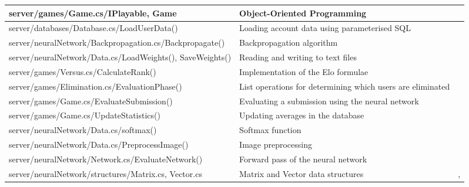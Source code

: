\documentclass{article}
\begin{document}
\begin{table}[H]
\begin{tabularx}{\textwidth}{|L|L|p{1cm}|}
        server/games/\newline Game.cs/IPlayable, Game & Object-Oriented Programming &\pageref{server/games/game.cs} \\\hline
        server/databases/\newline Database.cs/LoadUserData() & Loading account data using parameterised SQL &\pageref{server/databases/database.cs} \\\hline
        server/neuralNetwork/\newline Backpropagation.cs/Backpropagate() & Backpropagation algorithm &\pageref{server/neuralnetwork/backpropagation.cs} \\\hline
        server/neuralNetwork/\newline Data.cs/LoadWeights(), SaveWeights() & Reading and writing to text files &\pageref{server/neuralnetwork/data.cs} \\\hline
        server/games/\newline Versus.cs/CalculateRank() & Implementation of the Elo formulae &\pageref{server/games/versus.cs} \\\hline
        server/games/\newline Elimination.cs/EvaluationPhase() & List operations for determining which users are eliminated &\pageref{server/games/elimination.cs} \\\hline
        server/games/\newline Game.cs/EvaluateSubmission() & Evaluating a submission using the neural network &\pageref{server/games/game.cs} \\\hline
        server/games/\newline Game.cs/UpdateStatistics() & Updating averages in the database &\pageref{server/games/game.cs} \\\hline
        server/neuralNetwork/\newline Data.cs/softmax() & Softmax function &\pageref{server/neuralnetwork/data.cs} \\\hline
        server/neuralNetwork/\newline Data.cs/PreprocessImage() & Image preprocessing &\pageref{server/neuralnetwork/data.cs} \\\hline
        server/neuralNetwork/\newline Network.cs/EvaluateNetwork() & Forward pass of the neural network &\pageref{server/neuralnetwork/network.cs} \\\hline
		server/neuralNetwork/\newline structures/Matrix.cs, Vector.cs & Matrix and Vector data structures &\pageref{server/neuralnetwork/structures/matrix.cs}, \pageref{server/neuralnetwork/structures/vector.cs} \\\hline

\end{tabularx}
\end{table}
\end{document}
